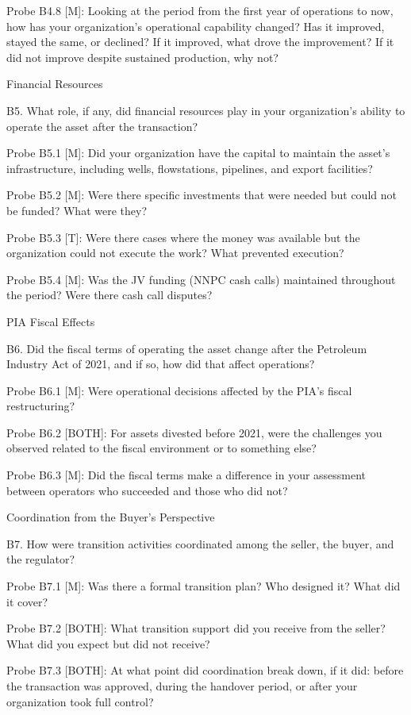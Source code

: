 \documentclass[twoside,fontset=lmodern]{mitthesis}
\begin{document}
Probe B4.8 {[}M{]}: Looking at the period from the first year of
operations to now, how has your organization's operational capability
changed? Has it improved, stayed the same, or declined? If it improved,
what drove the improvement? If it did not improve despite sustained
production, why not?

Financial Resources

B5. What role, if any, did financial resources play in your
organization's ability to operate the asset after the transaction?

Probe B5.1 {[}M{]}: Did your organization have the capital to maintain
the asset's infrastructure, including wells, flowstations, pipelines,
and export facilities?

Probe B5.2 {[}M{]}: Were there specific investments that were needed but
could not be funded? What were they?

Probe B5.3 {[}T{]}: Were there cases where the money was available but
the organization could not execute the work? What prevented execution?

Probe B5.4 {[}M{]}: Was the JV funding (NNPC cash calls) maintained
throughout the period? Were there cash call disputes?

PIA Fiscal Effects

B6. Did the fiscal terms of operating the asset change after the
Petroleum Industry Act of 2021, and if so, how did that affect
operations?

Probe B6.1 {[}M{]}: Were operational decisions affected by the PIA's
fiscal restructuring?

Probe B6.2 {[}BOTH{]}: For assets divested before 2021, were the
challenges you observed related to the fiscal environment or to
something else?

Probe B6.3 {[}M{]}: Did the fiscal terms make a difference in your
assessment between operators who succeeded and those who did not?

Coordination from the Buyer's Perspective

B7. How were transition activities coordinated among the seller, the
buyer, and the regulator?

Probe B7.1 {[}M{]}: Was there a formal transition plan? Who designed it?
What did it cover?

Probe B7.2 {[}BOTH{]}: What transition support did you receive from the
seller? What did you expect but did not receive?

Probe B7.3 {[}BOTH{]}: At what point did coordination break down, if it
did: before the transaction was approved, during the handover period, or
after your organization took full control?
\end{document}
